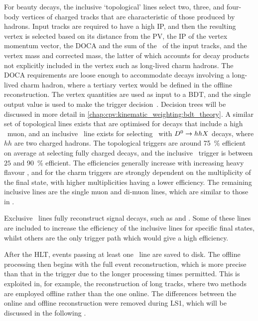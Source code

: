 For beauty decays, the inclusive `topological' lines select two, three, and 
four-body vertices of charged tracks that are characteristic of those produced 
by \PB hadrons.
Input tracks are required to have a high \ac{IP}, and then the resulting vertex 
is selected based on its distance from the \ac{PV}, the \ac{IP} of the vertex 
momentum vector, the \ac{DOCA} and the sum of the \pT\ of the input tracks, and 
the vertex mass and corrected mass, the latter of which accounts for decay 
products not explicitly included in the vertex such as long-lived charm 
hadrons.
The \ac{DOCA} requirements are loose enough to accommodate \PB decays involving 
a long-lived charm hadron, where a tertiary vertex would be defined in the 
offline reconstruction.
The vertex quantities are used as input to a \ac{BDT}, and the single output 
value is used to make the trigger 
decision~\cite{Gligorov:2011qxa,Gligorov:1384380}.
Decision trees will be discussed in more detail in 
\cref{chap:cpv:kinematic_weighting:bdt_theory}.
A similar set of topological lines exists that are optimised for \PB decays 
that include a high \pT\ muon, and an inclusive \PDstarp\ line exists for 
selecting \DstToDzpi\ with $D^{0} \to hhX$ decays, where $hh$ are two 
charged hadrons.
The topological \PB triggers are around \SI{75}{\percent} efficient on average 
at selecting fully charged \PB decays, and the inclusive \PDstarp\ trigger is 
between $25$ and \SI{90}{\percent} efficient.
The efficiencies generally increase with increasing heavy flavour \pT, and for 
the charm triggers are strongly dependent on the multiplicity of the final 
state, with higher multiplicities having a lower efficiency.
The remaining inclusive lines are the single muon and di-muon lines, which are 
similar to those in \hltone.

Exclusive \hlttwo\ lines fully reconstruct signal decays, such as 
\decay{\PB}{\pippim} and \decay{\PLambdac}{\Pproton\PKminus\Ppiplus}.
Some of these lines are included to increase the efficiency of the inclusive 
lines for specific final states, whilst others are the only trigger path which 
would give a high efficiency.

After the \acl{HLT}, events passing at least one \hlttwo\ line are saved to 
disk.
The offline processing then begins with the full event reconstruction, which is 
more precise than that in the trigger due to the longer processing times 
permitted.
This is exploited in, for example, the reconstruction of long tracks, where two 
methods are employed offline rather than the one online.
The differences between the online and offline reconstruction were removed 
during \ac{LS1}, which will be discussed in the following 
.

